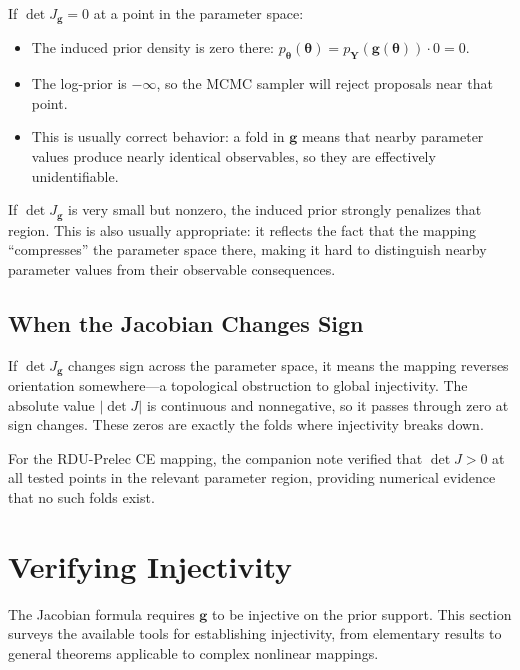 \documentclass[11pt,a4paper]{article}
\theoremstyle{definition}
\newcommand{\btheta}{\boldsymbol{\theta}}
\begin{document}
If $\det J_{\mathbf{g}} = 0$ at a point in the parameter space:
\begin{itemize}
    \item The induced prior density is zero there:
    $p_{\btheta}(\btheta) = p_{\mathbf{Y}}(\mathbf{g}(\btheta)) \cdot 0 = 0$.
    \item The log-prior is $-\infty$, so the MCMC sampler will reject
    proposals near that point.
    \item This is usually correct behavior: a fold in $\mathbf{g}$ means
    that nearby parameter values produce nearly identical observables, so they
    are effectively unidentifiable.
\end{itemize}

If $\det J_{\mathbf{g}}$ is very small but nonzero, the induced prior strongly
penalizes that region. This is also usually appropriate: it reflects the fact
that the mapping ``compresses'' the parameter space there, making it hard to
distinguish nearby parameter values from their observable consequences.

\subsection{When the Jacobian Changes Sign}

If $\det J_{\mathbf{g}}$ changes sign across the parameter space, it means the
mapping reverses orientation somewhere---a topological obstruction to global
injectivity. The absolute value $|\!\det J|$ is continuous and nonneg\-ative, so
it passes through zero at sign changes. These zeros are exactly the folds
where injectivity breaks down.

For the RDU-Prelec CE mapping, the companion note verified that
$\det J > 0$ at all tested points in the relevant parameter region, providing
numerical evidence that no such folds exist.


\section{Verifying Injectivity}
\label{sec:verifying}

The Jacobian formula requires $\mathbf{g}$ to be injective on the prior
support. This section surveys the available tools for establishing injectivity,
from elementary results to general theorems applicable to complex nonlinear
mappings.
\end{document}
